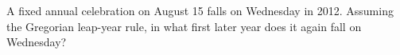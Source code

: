 A fixed annual celebration on August 15 falls on Wednesday in 2012. Assuming the Gregorian leap-year rule, in what first later year does it again fall on Wednesday?
